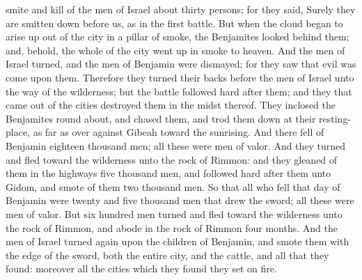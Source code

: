 smite and kill of the men of Israel about thirty persons; for they said, Surely they are smitten down before us, as in the first battle. But when the cloud began to arise up out of the city in a pillar of smoke, the Benjamites looked behind them; and, behold, the whole of the city went up in smoke to heaven. And the men of Israel turned, and the men of Benjamin were dismayed; for they saw that evil was come upon them. Therefore they turned their backs before the men of Israel unto the way of the wilderness; but the battle followed hard after them; and they that came out of the cities destroyed them in the midst thereof. They inclosed the Benjamites round about, and chased them, and trod them down at their resting-place, as far as over against Gibeah toward the sunrising. And there fell of Benjamin eighteen thousand men; all these were men of valor. And they turned and fled toward the wilderness unto the rock of Rimmon: and they gleaned of them in the highways five thousand men, and followed hard after them unto Gidom, and smote of them two thousand men. So that all who fell that day of Benjamin were twenty and five thousand men that drew the sword; all these were men of valor. But six hundred men turned and fled toward the wilderness unto the rock of Rimmon, and abode in the rock of Rimmon four months. And the men of Israel turned again upon the children of Benjamin, and smote them with the edge of the sword, both the entire city, and the cattle, and all that they found: moreover all the cities which they found they set on fire. 

